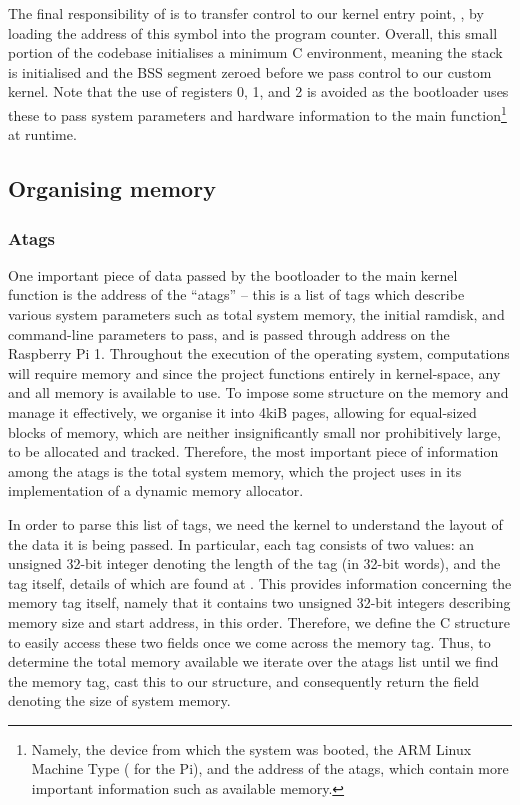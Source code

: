         The final responsibility of  is to transfer control to our
        kernel entry point, , by loading the address of this
        symbol into the program counter. Overall, this small portion of the
        codebase initialises a minimum C environment, meaning the stack is
        initialised and the BSS segment zeroed before we pass control to our
        custom kernel. Note that the use of registers 0, 1, and 2 is avoided as
        the bootloader uses these to pass system parameters and hardware
        information to the main function\footnote{Namely, the device from which
        the system was booted, the ARM Linux Machine Type ( for the
        Pi), and the address of the atags, which contain more important
        information such as available memory.} at runtime.

\subsection{Organising memory}
    \subsubsection{Atags}
        One important piece of data passed by the bootloader to the main kernel
        function is the address of the ``atags'' -- this is a list of tags which
        describe various system parameters such as total system memory, the
        initial ramdisk, and command-line parameters to pass, and is passed
        through address  on the Raspberry Pi 1. Throughout the
        execution of the operating system, computations will require memory and
        since the project functions entirely in kernel-space, any and all memory
        is available to use. To impose some structure on the memory and manage
        it effectively, we organise it into 4kiB pages, allowing for equal-sized
        blocks of memory, which are neither insignificantly small nor
        prohibitively large, to be allocated and tracked. Therefore, the most
        important piece of information among the atags is the total system
        memory, which the project uses in its implementation of a dynamic memory
        allocator.

        In order to parse this list of tags, we need the kernel to understand
        the layout of the data it is being passed. In particular, each tag
        consists of two values: an unsigned 32-bit integer denoting the length
        of the tag (in 32-bit words), and the tag itself, details of which are
        found at \cite{atags}. This provides information concerning the memory
        tag itself, namely that it contains two unsigned 32-bit integers
        describing memory size and start address, in this order. Therefore, we
        define the C structure  to easily access these two
        fields once we come across the memory tag. Thus, to determine the total
        memory available we iterate over the atags list until we find the memory
        tag, cast this to our  structure, and consequently
        return the field denoting the size of system memory.

